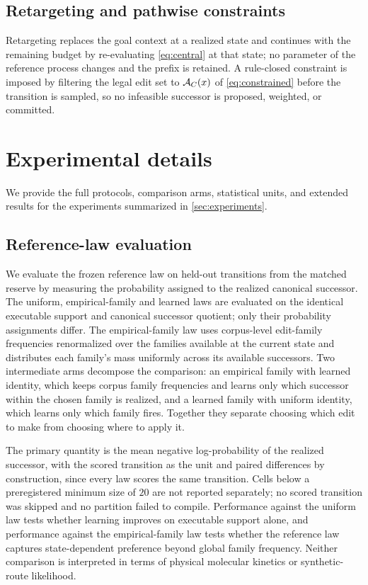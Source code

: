 \subsection{Retargeting and pathwise constraints}

Retargeting replaces the goal context at a realized state and continues with the remaining budget by re-evaluating \eqref{eq:central} at that state; no parameter of the reference process changes and the prefix is retained. A rule-closed constraint is imposed by filtering the legal edit set to $\mathcal{A}_C(x)$ of \eqref{eq:constrained} before the transition is sampled, so no infeasible successor is proposed, weighted, or committed.


\section{Experimental details}
\label{app:experiments}

We provide the full protocols, comparison arms, statistical units, and extended results for the experiments summarized in \cref{sec:experiments}.

\subsection{Reference-law evaluation}
\label{app:exp-rtheta}

We evaluate the frozen reference law on held-out transitions from the matched reserve by measuring the probability assigned to the realized canonical successor. The uniform, empirical-family and learned laws are evaluated on the identical executable support and canonical successor quotient; only their probability assignments differ. The empirical-family law uses corpus-level edit-family frequencies renormalized over the families available at the current state and distributes each family's mass uniformly across its available successors. Two intermediate arms decompose the comparison: an empirical family with learned identity, which keeps corpus family frequencies and learns only which successor within the chosen family is realized, and a learned family with uniform identity, which learns only which family fires. Together they separate choosing which edit to make from choosing where to apply it.

The primary quantity is the mean negative log-probability of the realized successor, with the scored transition as the unit and paired differences by construction, since every law scores the same transition. Cells below a preregistered minimum size of $20$ are not reported separately; no scored transition was skipped and no partition failed to compile. Performance against the uniform law tests whether learning improves on executable support alone, and performance against the empirical-family law tests whether the reference law captures state-dependent preference beyond global family frequency. Neither comparison is interpreted in terms of physical molecular kinetics or synthetic-route likelihood.

